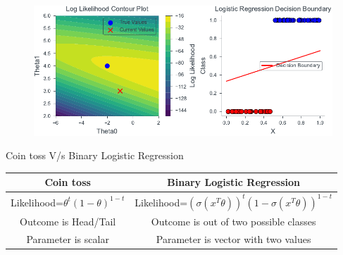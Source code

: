 \documentclass[handout]{beamer}
\begin{document}
\begin{frame}
    \begin{figure}
                \centerline{\includegraphics[scale=0.8]{../figures/mle/log_reg_slider_3.pdf}}
\end{figure}
\end{frame}

\begin{frame}{Coin toss V/s Binary Logistic Regression}
\begin{center}
    \begin{tabular}{|c|c|}
    \hline
    \textbf{Coin toss} & \textbf{Binary Logistic Regression} \\
    \hline
    Likelihood=$\theta^{t}(1-\theta)^{1-t}$& Likelihood=$(\sigma(x^T\theta))^t(1-\sigma(x^T\theta))^{1-t}$ \\
    \pause
    Outcome is Head/Tail & Outcome is out of two possible classes \\
    \pause
    Parameter is scalar & Parameter is vector with two values\\
    \hline
  \end{tabular}
\end{center}    
\end{frame}
\end{document}
